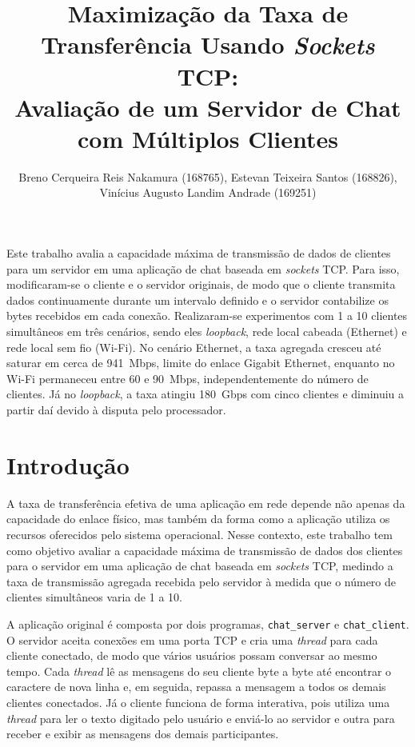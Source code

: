 \documentclass[12pt]{article}
\title{Maximização da Taxa de Transferência Usando \textit{Sockets} TCP:\\ Avaliação de um Servidor de Chat com Múltiplos Clientes}
\author{
	Breno Cerqueira Reis Nakamura (168765),
	Estevan Teixeira Santos (168826),
	\\Vinícius Augusto Landim Andrade (169251)
}
\begin{document}
\maketitle
\vspace{-1cm}
\begin{resumo}
  Este trabalho avalia a capacidade máxima de transmissão de dados de clientes
  para um servidor em uma aplicação de chat baseada em \textit{sockets} TCP.
  Para isso, modificaram-se o cliente e o servidor originais, de modo que o
  cliente transmita dados continuamente durante um intervalo definido e o
  servidor contabilize os bytes recebidos em cada conexão. Realizaram-se
  experimentos com 1 a 10 clientes simultâneos em três cenários, sendo eles
  \textit{loopback}, rede local cabeada (Ethernet) e rede local sem fio (Wi-Fi).
  No cenário Ethernet, a taxa
  agregada cresceu até saturar em cerca de 941~Mbps, limite do enlace Gigabit
  Ethernet, enquanto no Wi-Fi permaneceu entre 60 e 90~Mbps, independentemente
  do número de clientes. Já no \textit{loopback}, a taxa atingiu 180~Gbps com
  cinco clientes e diminuiu a partir daí devido à disputa pelo processador.
\end{resumo}


\section{Introdução}

A taxa de transferência efetiva de uma aplicação em rede depende não apenas da
capacidade do enlace físico, mas também da forma como a aplicação utiliza os
recursos oferecidos pelo sistema operacional. Nesse contexto, este trabalho tem
como objetivo avaliar a capacidade máxima de transmissão de dados dos clientes
para o servidor em uma aplicação de chat baseada em \textit{sockets} TCP,
medindo a taxa de transmissão agregada recebida pelo servidor à medida que o
número de clientes simultâneos varia de 1 a 10.

A aplicação original é composta por dois programas, \texttt{chat\_server} e
\texttt{chat\_client}. O servidor aceita conexões em uma porta TCP e cria uma
\textit{thread} para cada cliente conectado, de modo que vários usuários possam
conversar ao mesmo tempo. Cada \textit{thread} lê as mensagens do seu cliente
byte a byte até encontrar o caractere de nova linha e, em seguida, repassa a
mensagem a todos os demais clientes conectados. Já o cliente funciona de forma
interativa, pois utiliza uma \textit{thread} para ler o texto digitado pelo
usuário e enviá-lo ao servidor e outra para receber e exibir as mensagens dos
demais participantes.
\end{document}

